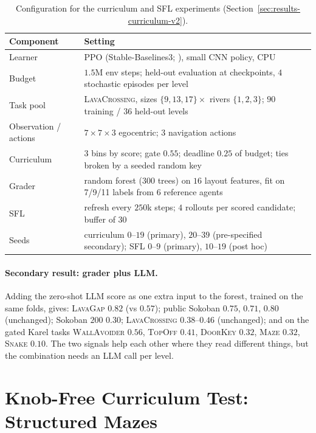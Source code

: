 \documentclass[twoside]{article}
\begin{document}
\begin{table}[htbp]
\centering
\caption{Configuration for the curriculum and SFL experiments (Section~\ref{sec:results-curriculum-v2}).}
\label{tab:curriculum-config}
\begin{tabular}{ll}
\toprule
Component & Setting \\
\midrule
Learner & PPO \citep{schulman2017proximal} (Stable-Baselines3; \citealp{raffin2021stable}), small CNN policy, CPU \\
Budget & $1.5$M env steps; held-out evaluation at checkpoints, $4$ stochastic episodes per level \\
Task pool & \textsc{LavaCrossing}, sizes $\{9,13,17\}\times$ rivers $\{1,2,3\}$; $90$ training / $36$ held-out levels \\
Observation / actions & $7\times7\times3$ egocentric; $3$ navigation actions \\
Curriculum & $3$ bins by score; gate $0.55$; deadline $0.25$ of budget; ties broken by a seeded random key \\
Grader & random forest ($300$ trees) on $16$ layout features, fit on 7/9/11 labels from $6$ reference agents \\
SFL & refresh every $250$k steps; $4$ rollouts per scored candidate; buffer of $30$ \\
Seeds & curriculum $0$--$19$ (primary), $20$--$39$ (pre-specified secondary); SFL $0$--$9$ (primary), $10$--$19$ (post hoc) \\
\bottomrule
\end{tabular}
\end{table}

\paragraph{Secondary result: grader plus LLM.} Adding the zero-shot LLM score as one extra input to the forest, trained on the same folds, gives: \textsc{LavaGap} $0.82$ (vs $0.57$); public Sokoban $0.75$, $0.71$, $0.80$ (unchanged); Sokoban $200$ $0.30$; \textsc{LavaCrossing} $0.38$--$0.46$ (unchanged); and on the gated Karel tasks \textsc{WallAvoider} $0.56$, \textsc{TopOff} $0.41$, \textsc{DoorKey} $0.32$, \textsc{Maze} $0.32$, \textsc{Snake} $0.10$. The two signals help each other where they read different things, but the combination needs an LLM call per level.

\section{Knob-Free Curriculum Test: Structured Mazes}
\label{app:maze}
\end{document}
